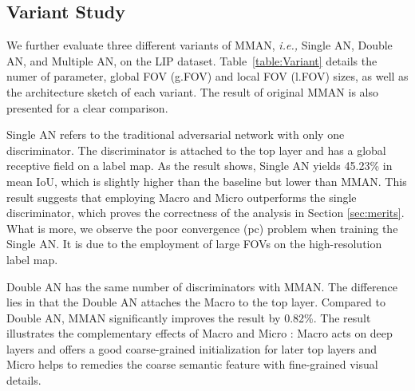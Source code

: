 \documentclass[runningheads]{llncs}
\begin{document}
\iffalse
\begin{figure}[t]
\centering
\texttt{[image: Failure\_cases]}
\caption{The failure cases generated by MMAN. In summary, we discover four kinds of conditions leading to the most of failing parsing result:
\textbf{(a)} Label conflict, \emph{e.g.,} the dress can be explained as an upper-cloth and a skirt. It can fool our discriminators, since the global structure as well as the local distribution are reasonable.
\textbf{(b)} Complex texture, \emph{e.g.,} the various of costumes may conceal the obvious structural features of the human body.
\textbf{(c)} Rare poses, \emph{e.g.,} the man fall. One of his leg is in the top of the image when his arms are close to the bottom.
\textbf{(d)} Scale varying. It is common in the Pascal-Person-Part dataset. Although the attention network~\cite{chen2016attention} alleviates this effect, we observe some failure cases in hard examples with very small human.}
\label{fig:failure}
\end{figure}
\fi

\subsection{Variant Study}\label{Variant}
We further evaluate three different variants of MMAN, \emph{i.e.,} Single AN, Double AN, and Multiple AN, on the LIP dataset. Table~\ref{table:Variant} details the numer of parameter, global FOV (g.FOV) and local FOV (l.FOV) sizes, as well as the architecture sketch of each variant. The result of original MMAN is also presented for a clear comparison.

Single AN refers to the traditional adversarial network with only one discriminator. The discriminator is attached to the top layer and has a global receptive field on a  label map. As the result shows, Single AN yields 45.23\% in mean IoU, which is slightly higher than the baseline but lower than MMAN. This result suggests that employing Macro  and Micro  outperforms the single discriminator, which proves the correctness of the analysis in Section \ref{sec:merits}. What is more, we observe the poor convergence (pc) problem when training the Single AN. It is due to the employment of large FOVs on the high-resolution label map.

Double AN has the same number of discriminators with MMAN. The difference lies in that the Double AN attaches the Macro  to the top layer. Compared to Double AN, MMAN significantly improves the result by 0.82\%. The result illustrates the complementary effects of Macro  and Micro : Macro  acts on deep layers and offers a good coarse-grained initialization for later top layers and Micro  helps to remedies the coarse semantic feature with fine-grained visual details. 
\end{document}
